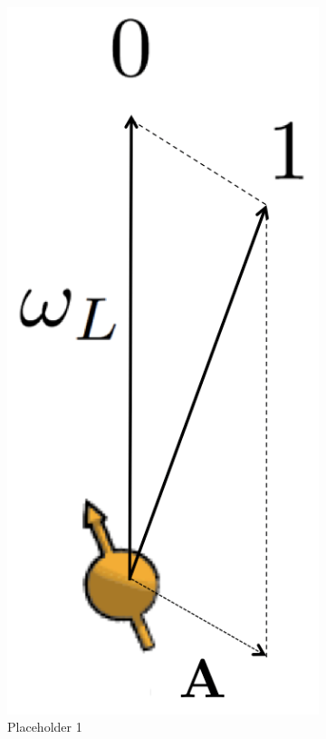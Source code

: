 \begin{figure}[htbp]
    \begin{subfigure}[t]{0.32\textwidth}\centering
    \includegraphics[scale=0.2]{Img/QuantizationAxis.png}
    \caption{Placeholder 1 } \label{fig:CR_C1}
    \end{subfigure}
    \begin{subfigure}[t]{0.32\textwidth}\centering

\end{subfigure}
\end{figure}
